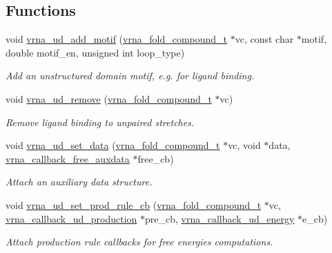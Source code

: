 \subsection*{Functions}
\begin{DoxyCompactItemize}
\item 
void \mbox{\hyperlink{group__domains__up_gaec0c3313fb2951946614f920d289829a}{vrna\+\_\+ud\+\_\+add\+\_\+motif}} (\mbox{\hyperlink{group__fold__compound_ga1b0cef17fd40466cef5968eaeeff6166}{vrna\+\_\+fold\+\_\+compound\+\_\+t}} $\ast$vc, const char $\ast$motif, double motif\+\_\+en, unsigned int loop\+\_\+type)
\begin{DoxyCompactList}\small\item\em Add an unstructured domain motif, e.\+g. for ligand binding. \end{DoxyCompactList}\item 
void \mbox{\hyperlink{group__domains__up_gada59cb0c498b812eadd010811af3f2d4}{vrna\+\_\+ud\+\_\+remove}} (\mbox{\hyperlink{group__fold__compound_ga1b0cef17fd40466cef5968eaeeff6166}{vrna\+\_\+fold\+\_\+compound\+\_\+t}} $\ast$vc)
\begin{DoxyCompactList}\small\item\em Remove ligand binding to unpaired stretches. \end{DoxyCompactList}\item 
void \mbox{\hyperlink{group__domains__up_gac1f18c312b91d80089534a87d956e58b}{vrna\+\_\+ud\+\_\+set\+\_\+data}} (\mbox{\hyperlink{group__fold__compound_ga1b0cef17fd40466cef5968eaeeff6166}{vrna\+\_\+fold\+\_\+compound\+\_\+t}} $\ast$vc, void $\ast$data, \mbox{\hyperlink{group__fold__compound_ga7806651f51b195013839a218b3bbd5a3}{vrna\+\_\+callback\+\_\+free\+\_\+auxdata}} $\ast$free\+\_\+cb)
\begin{DoxyCompactList}\small\item\em Attach an auxiliary data structure. \end{DoxyCompactList}\item 
void \mbox{\hyperlink{group__domains__up_ga745a99f0bc72898d54de16f6e538828a}{vrna\+\_\+ud\+\_\+set\+\_\+prod\+\_\+rule\+\_\+cb}} (\mbox{\hyperlink{group__fold__compound_ga1b0cef17fd40466cef5968eaeeff6166}{vrna\+\_\+fold\+\_\+compound\+\_\+t}} $\ast$vc, \mbox{\hyperlink{group__domains__up_ga4fdfc02c1b660c07f2d887772f02a0a1}{vrna\+\_\+callback\+\_\+ud\+\_\+production}} $\ast$pre\+\_\+cb, \mbox{\hyperlink{group__domains__up_ga75825c57d0bfde4ae4f95c044260c5c3}{vrna\+\_\+callback\+\_\+ud\+\_\+energy}} $\ast$e\+\_\+cb)
\begin{DoxyCompactList}\small\item\em Attach production rule callbacks for free energies computations. \end{DoxyCompactList}\item 

\end{DoxyCompactItemize}
